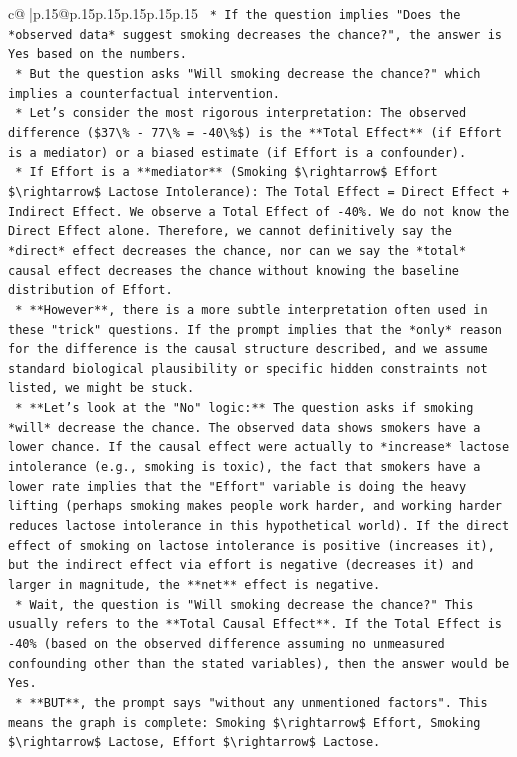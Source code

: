 \documentclass{article}
\begin{document}
{\begin{supertabular}{c@{$\;$}|p{.15\linewidth}@{}p{.15\linewidth}p{.15\linewidth}p{.15\linewidth}p{.15\linewidth}p{.15\linewidth}}
{{{\texttt{    *   If the question implies "Does the *observed data* suggest smoking decreases the chance?", the answer is Yes based on the numbers.} \\
\texttt{    *   But the question asks "Will smoking decrease the chance?" which implies a counterfactual intervention.} \\
\texttt{    *   Let's consider the most rigorous interpretation: The observed difference (\$37\textbackslash{}\% {-} 77\textbackslash{}\% = {-}40\textbackslash{}\%\$) is the **Total Effect** (if Effort is a mediator) or a biased estimate (if Effort is a confounder).} \\
\texttt{    *   If Effort is a **mediator** (Smoking \$\textbackslash{}rightarrow\$ Effort \$\textbackslash{}rightarrow\$ Lactose Intolerance): The Total Effect = Direct Effect + Indirect Effect. We observe a Total Effect of {-}40\%. We do not know the Direct Effect alone. Therefore, we cannot definitively say the *direct* effect decreases the chance, nor can we say the *total* causal effect decreases the chance without knowing the baseline distribution of Effort.} \\
\texttt{    *   **However**, there is a more subtle interpretation often used in these "trick" questions. If the prompt implies that the *only* reason for the difference is the causal structure described, and we assume standard biological plausibility or specific hidden constraints not listed, we might be stuck.} \\
\texttt{    *   **Let's look at the "No" logic:** The question asks if smoking *will* decrease the chance. The observed data shows smokers have a lower chance. If the causal effect were actually to *increase* lactose intolerance (e.g., smoking is toxic), the fact that smokers have a lower rate implies that the "Effort" variable is doing the heavy lifting (perhaps smoking makes people work harder, and working harder reduces lactose intolerance in this hypothetical world). If the direct effect of smoking on lactose intolerance is positive (increases it), but the indirect effect via effort is negative (decreases it) and larger in magnitude, the **net** effect is negative.} \\
\texttt{    *   Wait, the question is "Will smoking decrease the chance?" This usually refers to the **Total Causal Effect**. If the Total Effect is {-}40\% (based on the observed difference assuming no unmeasured confounding other than the stated variables), then the answer would be Yes.} \\
\texttt{    *   **BUT**, the prompt says "without any unmentioned factors". This means the graph is complete: Smoking \$\textbackslash{}rightarrow\$ Effort, Smoking \$\textbackslash{}rightarrow\$ Lactose, Effort \$\textbackslash{}rightarrow\$ Lactose.} \\
}}}
\end{supertabular}}
\end{document}
